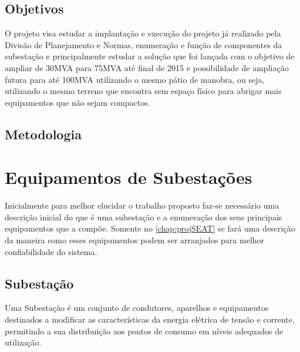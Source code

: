 \documentclass[a5paper,english,spanish,brazil]{ufsc-thesis}
\begin{document}
\section{Objetivos}
O projeto visa estudar a implantação e execução do projeto já realizado pela Divisão de Planejamento e Normas, enumeração e função de componentes da subestação e principalmente estudar a solução que foi lançada com o objetivo de ampliar de 30MVA para 75MVA até final de 2015 e possibilidade de ampliação futura para até 100MVA utilizando o mesmo pátio de manobra, ou seja, utilizando o mesmo terreno que encontra sem espaço físico para abrigar mais equipamentos que não sejam compactos.

\section{Metodologia}
\lipsum[1]


\chapter{Equipamentos de Subestações}
\label{chap:equipSE}
Inicialmente para melhor elucidar o trabalho proposto faz-se necessário uma descrição inicial do que é uma subestação e a enumeração dos seus principais equipamentos que a compõe. Somente no \autoref{chap:projSEAT} se fará uma descrição da maneira como esses equipamentos podem ser arranjados para melhor confiabilidade do sistema.
\section*{Subestação}
Uma Subestação é um conjunto de condutores, aparelhos e equipamentos destinados a modificar as características da energia elétrica de tensão e corrente, permitindo a sua distribuição aos pontos de consumo em níveis adequados de utilização.\cite{instElet}
\end{document}
